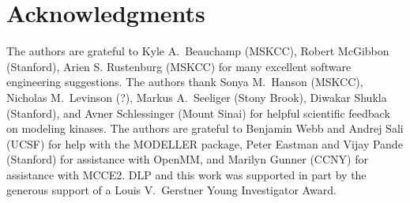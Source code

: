 \documentclass[aps,pre,twocolumn,nofootinbib,superscriptaddress,linenumbers]{revtex4-1}
\begin{document}
\section{Acknowledgments}
\label{section:acknowledgments}

The authors are grateful to Kyle A.~Beauchamp (MSKCC), Robert McGibbon (Stanford), Arien S. Rustenburg (MSKCC) for many excellent software engineering suggestions.
The authors thank Sonya M.~Hanson (MSKCC), Nicholas M.~Levinson (?), Markus A.~Seeliger (Stony Brook), Diwakar Shukla (Stanford), and Avner Schlessinger (Mount Sinai) for helpful scientific feedback on modeling kinases.
The authors are grateful to Benjamin Webb and Andrej Sali (UCSF) for help with the MODELLER package, Peter Eastman and Vijay Pande (Stanford) for assistance with OpenMM, and Marilyn Gunner (CCNY) for assistance with MCCE2.
DLP and this work was supported in part by the generous support of a Louis V.~Gerstner Young Investigator Award.


% 

\end{document}
